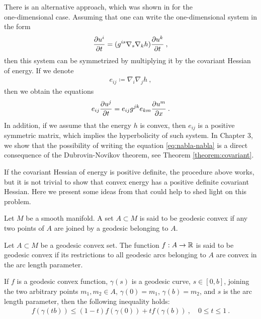 There is an alternative approach, which was shown in \cite{Pavelka} for the \\one-dimensional case. Assuming that one can write the one-dimensional system in the form
\begin{align}
    \frac{\partial u^i}{\partial t} = (g^{is} \nabla_s \nabla_k h) \frac{\partial u^k}{\partial t} \:, \label{eq:nabla-nabla}
\end{align}
then this system can be symmetrized by multiplying it by the covariant Hessian of energy. If we denote
\begin{align}
    e_{ij} \coloneqq \nabla_i \nabla_j h \:,
\end{align}
then we obtain the equations
\begin{align}
    e_{ij} \frac{\partial u^j}{\partial t} = e_{ij} g^{jk} e_{km} \frac{\partial u^m}{\partial x} \:.
\end{align}
In addition, if we assume that the energy $h$ is convex, then $e_{ij}$ is a positive symmetric matrix, which implies the hyperbolicity of such system. In Chapter 3, we show that the possibility of writing the equation \eqref{eq:nabla-nabla} is a direct consequence of the Dubrovin-Novikov theorem, see Theorem \vref{theorem:covariant}. 

If the covariant Hessian of energy is positive definite, the procedure above works, but it is not trivial to show
that convex energy has a positive definite covariant Hessian. Here we present some ideas from \cite{Rapcsak} that could help to shed light on this problem.

\begin{definition}
    Let $M$ be a smooth manifold. A set $A \subset M$ is said to be geodesic convex if any two points of $A$ are joined by a geodesic belonging to $A$.
\end{definition}

\begin{definition}
    Let $A \subset M$ be a geodesic convex set. The function $f : A \to \mathbb{R}$ is said to be geodesic convex if its restrictions to all geodesic arcs belonging to $A$ are convex in the arc length parameter.
\end{definition}

If $f$ is a geodesic convex function, $\gamma(s)$ is a geodesic curve, $s \in [0,b]$, joining the two arbitrary points $m_1, m_2 \in A$, $\gamma(0) = m_1$, $\gamma(b) = m_2$, and $s$ is the arc length parameter, then the following inequality holds:
\begin{align}
    f(\gamma(tb)) \leq (1-t) f(\gamma(0)) + t f(\gamma(b)) \:, \quad 0 \leq t \leq 1 \:.
\end{align}

